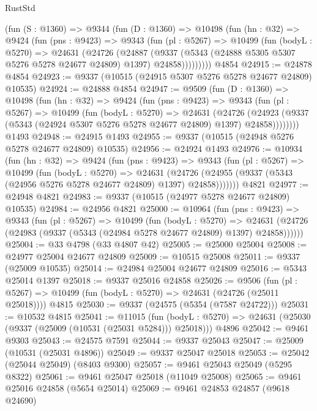 \begin{lexlean}{RustStd}
\begin{coremodule}
    (fun (S : @1360) =>
    @9344
      (fun (D : @1360) =>
      @10498
        (fun (hn : @32) =>
        @9424
          (fun (pns : @9423) =>
          @9343
            (fun (pl : @5267) =>
            @10499
              (fun (bodyL : @5270) =>
              @24631
                (@24726
                  (@24887
                    (@9337
                      (@5343 (@24888 @5305 @5307 @5276 @5278 @24677 @24809) @1397)
                      @24858)))))))))
    @4854
@24915 := @24878 @4854
@24923 := @9337 (@10515 (@24915 @5307 @5276 @5278 @24677 @24809) @10535)
@24924 := @24888 @4854
@24947 := @9509
    (fun (D : @1360) =>
    @10498
      (fun (hn : @32) =>
      @9424
        (fun (pns : @9423) =>
        @9343
          (fun (pl : @5267) =>
          @10499
            (fun (bodyL : @5270) =>
            @24631
              (@24726
                (@24923 (@9337 (@5343 (@24924 @5307 @5276 @5278 @24677 @24809) @1397) @24858))))))))
    @1493
@24948 := @24915 @1493
@24955 := @9337 (@10515 (@24948 @5276 @5278 @24677 @24809) @10535)
@24956 := @24924 @1493
@24976 := @10934
    (fun (hn : @32) =>
    @9424
      (fun (pns : @9423) =>
      @9343
        (fun (pl : @5267) =>
        @10499
          (fun (bodyL : @5270) =>
          @24631
            (@24726 (@24955 (@9337 (@5343 (@24956 @5276 @5278 @24677 @24809) @1397) @24858)))))))
    @4821
@24977 := @24948 @4821
@24983 := @9337 (@10515 (@24977 @5278 @24677 @24809) @10535)
@24984 := @24956 @4821
@25000 := @10964
    (fun (pns : @9423) =>
    @9343
      (fun (pl : @5267) =>
      @10499
        (fun (bodyL : @5270) =>
        @24631 (@24726 (@24983 (@9337 (@5343 (@24984 @5278 @24677 @24809) @1397) @24858))))))
@25004 := @33 @4798 (@33 @4807 @42)
@25005 := @25000 @25004
@25008 := @24977 @25004 @24677 @24809
@25009 := @10515 @25008
@25011 := @9337 (@25009 @10535)
@25014 := @24984 @25004 @24677 @24809
@25016 := @5343 @25014 @1397
@25018 := @9337 @25016 @24858
@25026 := @9506
    (fun (pl : @5267) => @10499 (fun (bodyL : @5270) => @24631 (@24726 (@25011 @25018))))
    @4815
@25030 := @9337 (@24575 (@5354 (@7587 @24722)))
@25031 := @10532 @4815
@25041 := @11015
    (fun (bodyL : @5270) => @24631 (@25030 (@9337 (@25009 (@10531 (@25031 @5284))) @25018)))
    @4896
@25042 := @9461 @9303
@25043 := @24575 @7591
@25044 := @9337 @25043
@25047 := @25009 (@10531 (@25031 @4896))
@25049 := @9337 @25047 @25018
@25053 := @25042 (@25044 @25049) (@8403 @9300)
@25057 := @9461 @25043 @25049 (@5295 @8322)
@25061 := @9461 @25047 @25018 (@11049 @25008)
@25065 := @9461 @25016 @24858 (@5654 @25014)
@25069 := @9461 @24853 @24857 (@9618 @24690)

\end{coremodule}
\end{lexlean}
